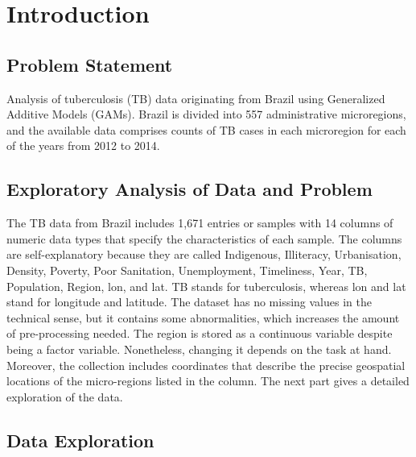 \section{Introduction}

\subsection{Problem Statement}
Analysis of tuberculosis (TB) data originating from Brazil using Generalized Additive Models (GAMs). Brazil is divided into 557 administrative microregions, and the available data
comprises counts of TB cases in each microregion for each of the years from 2012 to 2014.

\subsection{Exploratory Analysis of Data and Problem}

The TB data from Brazil includes 1,671 entries or samples with 14 columns of numeric data types that specify the characteristics of each sample. The columns are self-explanatory because they are called Indigenous, Illiteracy, Urbanisation, Density, Poverty, Poor Sanitation, Unemployment, Timeliness, Year, TB, Population, Region, lon, and lat. TB stands for tuberculosis, whereas lon and lat stand for longitude and latitude. The dataset has no missing values in the technical sense, but it contains some abnormalities, which increases the amount of pre-processing needed. The region is stored as a continuous variable despite being a factor variable. Nonetheless, changing it depends on the task at hand. Moreover, the collection includes coordinates that describe the precise geospatial locations of the micro-regions listed in the column. The next part gives a detailed exploration of  the data.

\subsection{Data Exploration}


